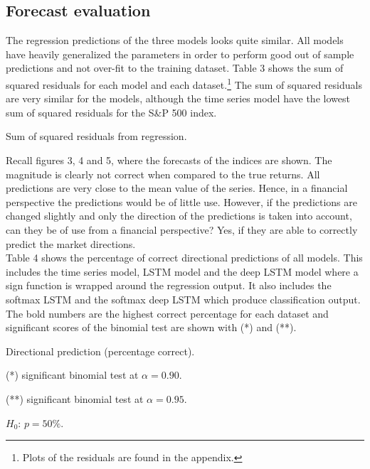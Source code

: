 \documentclass[12pt, letterpaper]{amsart}%
\begin{document}
\subsection{Forecast evaluation}
The regression predictions of the three models looks quite similar. All models have heavily generalized the parameters in order to perform good out of sample predictions and not over-fit to the training dataset. Table 3 shows the sum of squared residuals for each model and each dataset.\footnote{Plots of the residuals are found in the appendix.} The sum of squared residuals are very similar for the models, although the time series model have the lowest sum of squared residuals for the S\&P 500 index.

\begin{table}%
\centering
\caption{Sum of squared residuals from regression.}
\end{table}

Recall figures 3, 4 and 5, where the forecasts of the indices are shown. The magnitude is clearly not correct when compared to the true returns. All predictions are very close to the mean value of the series. Hence, in a financial perspective the predictions would be of little use. However, if the predictions are changed slightly and only the direction of the predictions is taken into account, can they be of use from a financial perspective? Yes, if they are able to correctly predict the market directions.
\\

Table 4 shows the percentage of correct directional predictions of all models. This includes the time series model, LSTM model and the deep LSTM model where a sign function is wrapped around the regression output. It also includes the softmax LSTM and the softmax deep LSTM which produce classification output. The bold numbers are the highest correct percentage for each dataset and significant scores of the binomial test are shown with (*) and (**).
\\

\begin{table}%
\centering
\caption{Directional prediction (percentage correct).}
	\begin{tablenotes}
	\small
	\item  (*) significant binomial test at $\alpha=0.90$.
	\item (**) significant binomial test at $\alpha=0.95$.
	\item $H_0$: $p = 50\%$.
	\end{tablenotes}
\end{table}
\end{document}
